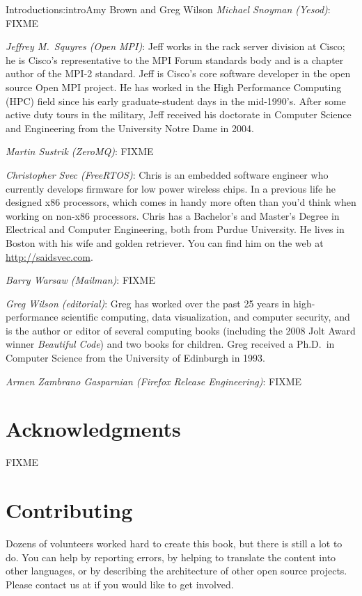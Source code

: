 \begin{aosachapter}{Introduction}{s:intro}{Amy Brown and Greg Wilson}
\emph{Michael Snoyman (Yesod)}: FIXME

\emph{Jeffrey M.\ Squyres (Open MPI)}: Jeff works in the rack server
division at Cisco; he is Cisco's representative to the MPI Forum
standards body and is a chapter author of the MPI-2 standard.  Jeff is
Cisco's core software developer in the open source Open MPI project.
He has worked in the High Performance Computing (HPC) field since his
early graduate-student days in the mid-1990's.  After some active duty
tours in the military, Jeff received his doctorate in Computer Science
and Engineering from the University Notre Dame in 2004.

\emph{Martin Sustrik (ZeroMQ)}: FIXME

\emph{Christopher Svec (FreeRTOS)}: Chris is an embedded software
engineer who currently develops firmware for low power wireless chips.
In a previous life he designed x86 processors, which comes in handy
more often than you'd think when working on non-x86 processors.
Chris has a Bachelor’s and Master’s Degree in Electrical
and Computer Engineering, both from Purdue University.
He lives in Boston with his wife and golden retriever. You can find
him on the web at \url{http://saidsvec.com}.

\emph{Barry Warsaw (Mailman)}: FIXME

\emph{Greg Wilson (editorial)}: Greg has worked over the past 25 years
in high-performance scientific computing, data visualization, and
computer security, and is the author or editor of several computing
books (including the 2008 Jolt Award winner \emph{Beautiful Code}) and
two books for children.  Greg received a Ph.D.\ in Computer Science
from the University of Edinburgh in 1993.

\emph{Armen Zambrano Gasparnian (Firefox Release Engineering)}: FIXME

\section*{Acknowledgments}

FIXME

\section*{Contributing}

Dozens of volunteers worked hard to create this book, but there is
still a lot to do.  You can help by reporting errors, by helping to
translate the content into other languages, or by describing the
architecture of other open source projects.  Please contact us at
 if you would like to get involved.

\end{aosachapter}
